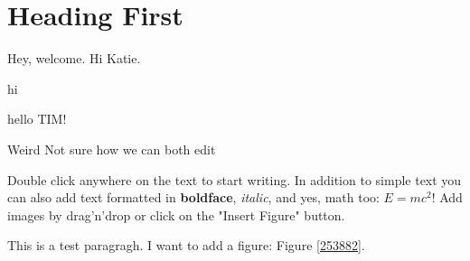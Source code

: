 \section{Heading First}
Hey, welcome. Hi Katie. 


hi

hello TIM! 

Weird Not sure how we can both edit


Double click anywhere on the text to start writing. In addition to simple text you can also add text formatted in \textbf{boldface}, \textit{italic}, and yes, math too: $E  =  mc^{2}$! Add images by drag'n'drop or click on the "Insert Figure" button. 

This is a test paragragh. I want to add a figure: Figure \ref{253882}.


